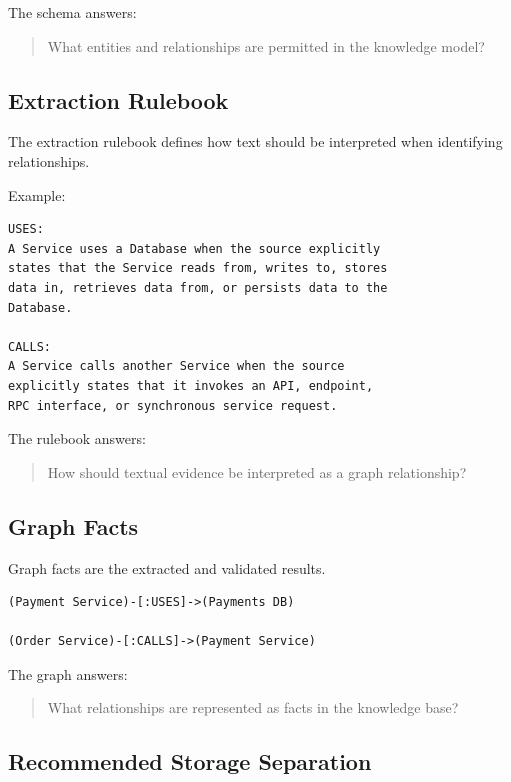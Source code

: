\documentclass[11pt,a4paper]{article}
\begin{document}
The schema answers:

\begin{quote}
What entities and relationships are permitted in the knowledge model?
\end{quote}

\subsection{Extraction Rulebook}

The extraction rulebook defines how text should be interpreted when identifying relationships.

Example:

\begin{lstlisting}
USES:
A Service uses a Database when the source explicitly
states that the Service reads from, writes to, stores
data in, retrieves data from, or persists data to the
Database.

CALLS:
A Service calls another Service when the source
explicitly states that it invokes an API, endpoint,
RPC interface, or synchronous service request.
\end{lstlisting}

The rulebook answers:

\begin{quote}
How should textual evidence be interpreted as a graph relationship?
\end{quote}

\subsection{Graph Facts}

Graph facts are the extracted and validated results.

\begin{lstlisting}
(Payment Service)-[:USES]->(Payments DB)

(Order Service)-[:CALLS]->(Payment Service)
\end{lstlisting}

The graph answers:

\begin{quote}
What relationships are represented as facts in the knowledge base?
\end{quote}

\subsection{Recommended Storage Separation}
\end{document}
